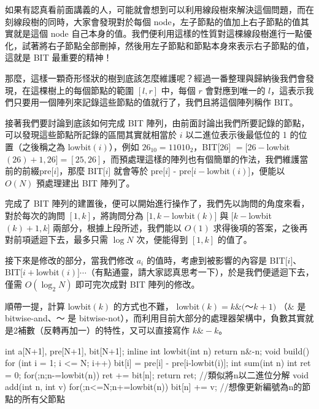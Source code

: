 \par 如果有認真看前面講義的人，可能就會想到可以利用線段樹來解決這個問題，而在刻線段樹的同時，大家會發現對於每個 node，左子節點的值加上右子節點的值其實就是這個 node 自己本身的值。我們便利用這樣的性質對這棵線段樹進行一點優化，試著將右子節點全部刪掉，然後用左子節點和節點本身來表示右子節點的值，這就是 BIT 最重要的精神！\\

\par 那麼，這樣一顆奇形怪狀的樹到底該怎麼維護呢？經過一番整理與歸納後我們會發現，在這棵樹上的每個節點的範圍 $[l, r]$ 中，每個 $r$ 會對應到唯一的 $l$，這表示我們只要用一個陣列來記錄這些節點的值就行了，我們且將這個陣列稱作 BIT。\\

\par 接著我們要討論到底該如何完成 BIT 陣列，由前面討論出我們所要記錄的節點，可以發現這些節點所記錄的區間其實就相當於 $i$ 以二進位表示後最低位的 1 的位置（之後稱之為 lowbit$(i)$），例如 $26_{10} = 11010_{2}$，BIT[26] $= [26-$lowbit$(26)+1, 26] = [25, 26]$，而預處理這樣的陣列也有個簡單的作法，我們維護當前的前綴pre[$i$]，那麼 BIT[$i$] 就會等於 pre[$i$] - pre[$i-$lowbit$(i)$]，便能以 $O(N)$ 預處理建出 BIT 陣列了。\\

\par 完成了 BIT 陣列的建置後，便可以開始進行操作了，我們先以詢問的角度來看，對於每次的詢問 $[1, k]$，將詢問分為 $[1, k-$lowbit$(k)]$ 與 $[k-$lowbit$(k)+1, k]$ 兩部分，根據上段所述，我們能以 $O(1)$ 求得後項的答案，之後再對前項遞迴下去，最多只需 $\log{N}$ 次，便能得到 $[1, k]$ 的值了。\\

\par 接下來是修改的部分，當我們修改 $a_i$ 的值時，考慮到被影響的內容是 BIT[$i$]、BIT[$i+$lowbit$(i)]\cdots$（有點通靈，請大家認真思考一下），於是我們便遞迴下去，僅需 $O(\log_2{N})$ 即可完次成對 BIT 陣列的修改。\\

\par 順帶一提，計算 lowbit$(k)$ 的方式也不難， lowbit$(k) = k \& ($～$k + 1 )$ （$\&$ 是 bitwise-and、～ 是 bitwise-not），而利用目前大部分的處理器架構中，負數其實就是2補數（反轉再加一）的特性，又可以直接寫作 $k \& -k$。\\

\begin{C++}
int a[N+1], pre[N+1], bit[N+1];
inline int lowbit(int n) { return n&-n; }
void build() {
  for (int i = 1; i <= N; i++) 
    bit[i] = pre[i] - pre[i-lowbit(i)];
}
int sum(int n) {
	int ret = 0;
	for(;n;n-=lowbit(n)) ret += bit[n];
	return ret;
	//類似將n以二進位分解
}
void add(int n, int v) {
	for(;n<=N;n+=lowbit(n)) bit[n] += v;
	//想像更新編號為n的節點的所有父節點
}
\end{C++}

